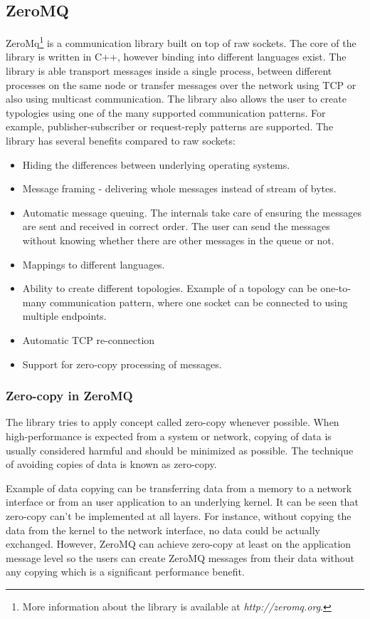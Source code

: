 \subsection{ZeroMQ}
\label{zeromq}
ZeroMq\footnote{More information about the library is available at \textit{http://zeromq.org}.} is a communication library built on top of raw sockets. The core of the library is written in C++, however binding into different languages exist. The library is able transport messages inside a single process, between different processes on the same node or transfer messages over the network using TCP or also using multicast communication. The library also allows the user to create typologies using one of the many supported communication patterns. For example, publisher-subscriber or request-reply patterns are supported. The library has several benefits compared to raw sockets:
\begin{itemize}
	\item Hiding the differences between underlying operating systems.
	\item Message framing - delivering whole messages instead of stream of bytes.
	\item Automatic message queuing. The internals take care of ensuring the messages are sent and received in correct order. The user can send the messages without knowing whether there are other messages in the queue or not.
	\item Mappings to different languages.
	\item Ability to create different topologies. Example of a topology can be one-to-many communication pattern, where one socket can be connected to using multiple endpoints. 
	\item Automatic TCP re-connection
	\item Support for zero-copy processing of messages.
\end{itemize}
\subsubsection{Zero-copy in ZeroMQ}
The library tries to apply concept called zero-copy whenever possible. When high-performance is expected from a system or network, copying of data is usually considered harmful and should be minimized as possible. The technique of avoiding copies of data is known as zero-copy.

Example of data copying can be transferring data from a memory to a network interface or from an user application to an underlying kernel. It can be seen that zero-copy can't be implemented at all layers. For instance, without copying the data from the kernel to the network interface, no data could be actually exchanged. However, ZeroMQ can achieve zero-copy at least on the application message level so the users can create ZeroMQ messages from their data without any copying which is a significant performance benefit.

